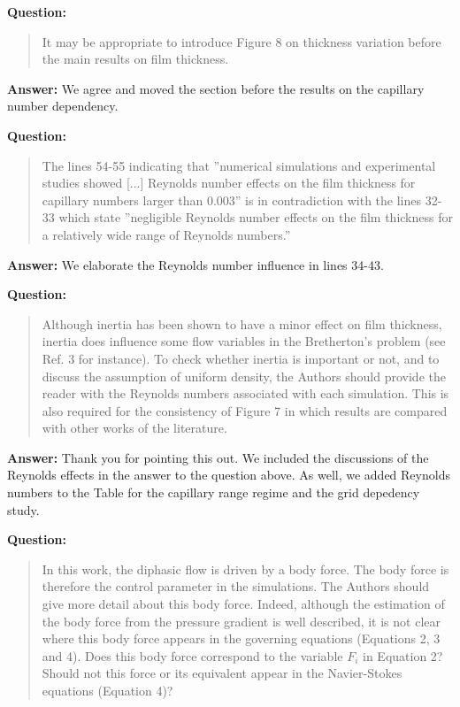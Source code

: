 \documentclass{article}
\begin{document}
\textbf{Question:}
\begin{quotation}
It may be appropriate to introduce Figure 8 on thickness variation before the main results on ﬁlm
thickness.
\end{quotation}

\textbf{Answer:} We agree and moved the section before the results on the capillary number
dependency.


\textbf{Question:}
\begin{quotation}
The lines 54-55 indicating that ”numerical simulations and experimental studies showed [...]
Reynolds
number effects on the film thickness for capillary numbers larger than 0.003” is in contradiction
with
the lines 32-33 which state ”negligible Reynolds number effects on the film thickness for a
relatively
wide range of Reynolds numbers.”
\end{quotation}

\textbf{Answer:} We elaborate the Reynolds number influence in lines 34-43.

\textbf{Question:}
\begin{quotation}
Although inertia has been shown to have a minor effect on ﬁlm thickness, inertia does influence
some flow variables in the Bretherton’s problem (see Ref. 3 for instance). To check whether inertia
is important or not, and to discuss the assumption of uniform density, the Authors should provide
the reader with the Reynolds numbers associated with each simulation. This is also required for the
consistency of Figure 7 in which results are compared with other works of the literature.
\end{quotation}

\textbf{Answer:} Thank you for pointing this out. We included the discussions of the Reynolds
effects in the answer to the question above. As well, we added Reynolds numbers to the Table for
the capillary range regime and the grid depedency study. 

\textbf{Question:}
\begin{quotation}
In this work, the diphasic flow is driven by a body force. The body force is therefore the control
parameter in the simulations. The Authors should give more detail about this body force. Indeed,
although the estimation of the body force from the pressure gradient is well described, it is not
clear
where this body force appears in the governing equations (Equations 2, 3 and 4). Does this body
force correspond to the variable $F_i$ in Equation 2? Should not this force or its equivalent appear
in
the Navier-Stokes equations (Equation 4)?
\end{quotation}
\end{document}
